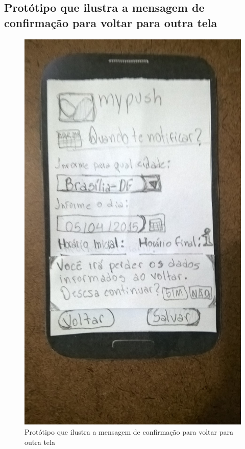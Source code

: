 \begin{anexosenv}
  \pagebreak
  \section*{Protótipo que ilustra a mensagem de confirmação para voltar para outra tela}

    \begin{figure}[!htbp]
      \centering
      \includegraphics[scale=0.32, angle=-90]{editaveis/figuras/prototipo_papel_v2/confirmacao_perda_dados}
      \caption{Protótipo que ilustra a mensagem de confirmação para voltar para outra tela}
      \label{confirmacao_perda_dados_v2}
    \end{figure}
    

\end{anexosenv}
